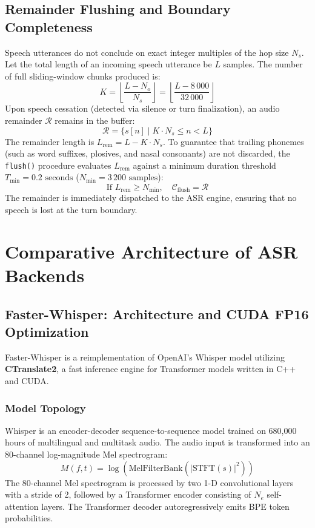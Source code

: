 \documentclass[11pt,a4paper,titlepage]{report}
\begin{document}
\section{Remainder Flushing and Boundary Completeness}
Speech utterances do not conclude on exact integer multiples of the hop size $N_s$. Let the total length of an incoming speech utterance be $L$ samples. The number of full sliding-window chunks produced is:
\begin{equation}
    K = \left\lfloor \frac{L - N_o}{N_s} \right\rfloor = \left\lfloor \frac{L - 8\,000}{32\,000} \right\rfloor
\end{equation}
Upon speech cessation (detected via silence or turn finalization), an audio remainder $\mathcal{R}$ remains in the buffer:
\begin{equation}
    \mathcal{R} = \{ s[n] \mid K \cdot N_s \le n < L \}
\end{equation}
The remainder length is $L_{\text{rem}} = L - K \cdot N_s$. To guarantee that trailing phonemes (such as word suffixes, plosives, and nasal consonants) are not discarded, the \texttt{flush()} procedure evaluates $L_{\text{rem}}$ against a minimum duration threshold $T_{\text{min}} = 0.2\text{ seconds}$ ($N_{\text{min}} = 3\,200\text{ samples}$):
\begin{equation}
    \text{If } L_{\text{rem}} \ge N_{\text{min}}, \quad \mathcal{C}_{\text{flush}} = \mathcal{R}
\end{equation}
The remainder is immediately dispatched to the ASR engine, ensuring that no speech is lost at the turn boundary.

\newpage

\chapter{Comparative Architecture of ASR Backends}

\section{Faster-Whisper: Architecture and CUDA FP16 Optimization}
Faster-Whisper is a reimplementation of OpenAI's Whisper model utilizing \textbf{CTranslate2}, a fast inference engine for Transformer models written in C++ and CUDA. 

\subsection{Model Topology}
Whisper is an encoder-decoder sequence-to-sequence model trained on 680,000 hours of multilingual and multitask audio. The audio input is transformed into an 80-channel log-magnitude Mel spectrogram:
\begin{equation}
    M(f, t) = \log\left( \text{MelFilterBank}\left( |\text{STFT}(s)|^2 \right) \right)
\end{equation}
The 80-channel Mel spectrogram is processed by two 1-D convolutional layers with a stride of 2, followed by a Transformer encoder consisting of $N_e$ self-attention layers. The Transformer decoder autoregressively emits BPE token probabilities.
\end{document}
